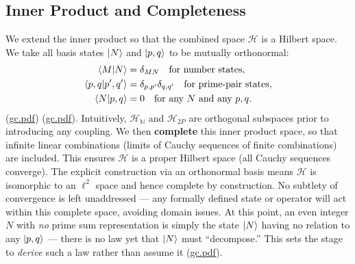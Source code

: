 \documentclass[12pt]{article}
\begin{document}
\subsection{Inner Product and Completeness}
We extend the inner product so that the combined space $\mathcal{H}$ is a Hilbert space. We take all basis states $\ket{N}$ and $\ket{p,q}$ to be mutually orthonormal:
\begin{align*}
\braket{M|N} &= \delta_{MN} \quad \text{for number states}, \\
\braket{p,q|p',q'} &= \delta_{p,p'}\delta_{q,q'} \quad \text{for prime-pair states}, \\
\braket{N|p,q} &= 0 \quad \text{for any } N \text{ and any } p,q.
\end{align*}
(\href{file://file-7ZYYwSHWVa83XEVTrEhg5z#:~:text=Definition%204%20,N%7D%7D%24%2C%20%24%5Clangle%20p%2Cq%7Cp%27%2Cq%27%5Crangle}{gc.pdf}) (\href{file://file-7ZYYwSHWVa83XEVTrEhg5z#:~:text=M%7CN%5Crangle%3D%5Cdelta_,N%5Crangle%24%20basis%20with%20shift}{gc.pdf}). Intuitively, $\mathcal{H}_{\mathbb{N}}$ and $\mathcal{H}_{2P}$ are orthogonal subspaces prior to introducing any coupling. We then \textbf{complete} this inner product space, so that infinite linear combinations (limits of Cauchy sequences of finite combinations) are included. This ensures $\mathcal{H}$ is a proper Hilbert space (all Cauchy sequences converge). The explicit construction via an orthonormal basis means $\mathcal{H}$ is isomorphic to an $\ell^2$ space and hence complete by construction. No subtlety of convergence is left unaddressed --- any formally defined state or operator will act within this complete space, avoiding domain issues. At this point, an even integer $N$ with \textit{no} prime sum representation is simply the state $\ket{N}$ having no relation to any $\ket{p,q}$ --- there is no law yet that $\ket{N}$ must “decompose.” This sets the stage to \textit{derive} such a law rather than assume it (\href{file://file-7ZYYwSHWVa83XEVTrEhg5z#:~:text=operators,rangle%24%20and%20those%20pair%20states}{gc.pdf}).
\end{document}
